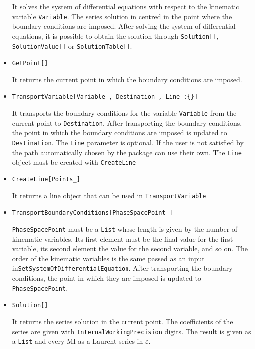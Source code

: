 \begin{itemize}
    It solves the system of differential equations with respect to the kinematic variable \texttt{Variable}. The series solution in centred in the point where the boundary conditions are imposed. After solving the system of differential equations, it is possible to obtain the solution through \texttt{Solution[]}, \texttt{SolutionValue[]} or \texttt{SolutionTable[]}.
    
    \item \texttt{GetPoint[]}
    
    It returns the current point in which the boundary conditions are imposed.
    
    \item \texttt{TransportVariable[Variable\_, Destination\_, Line\_:\{\}]}
    
    It transports the boundary conditions for the variable \texttt{Variable} from the current point to \texttt{Destination}. After transporting the boundary conditions, the point in which the boundary conditions are imposed is updated to \texttt{Destination}. The \texttt{Line} parameter is optional. If the user is not satisfied by the path automatically chosen by the package can use their own. The \texttt{Line} object must be created with \texttt{CreateLine}
    
    \item \texttt{CreateLine[Points\_]}
    
    It returns a line object that can be used in \texttt{TransportVariable}
    
    \item \texttt{TransportBoundaryConditions[PhaseSpacePoint\_]}
    
    \texttt{PhaseSpacePoint} must be a \texttt{List} whose length is given by the number of kinematic variables. Its first element must be the final value for the first variable, its second element the value for the second variable, and so on. The order of the kinematic variables is the same passed as an input in\texttt{SetSystemOfDifferentialEquation}. After transporting the boundary conditions, the point in which they are imposed is updated to \texttt{PhaseSpacePoint}.
    
    \item \texttt{Solution[]}
    
    It returns the series solution in the current point. The coefficients of the series are given with \texttt{InternalWorkingPrecision} digits. The result is given as a \texttt{List} and every MI as a Laurent series in $\varepsilon$.
    

\end{itemize}
